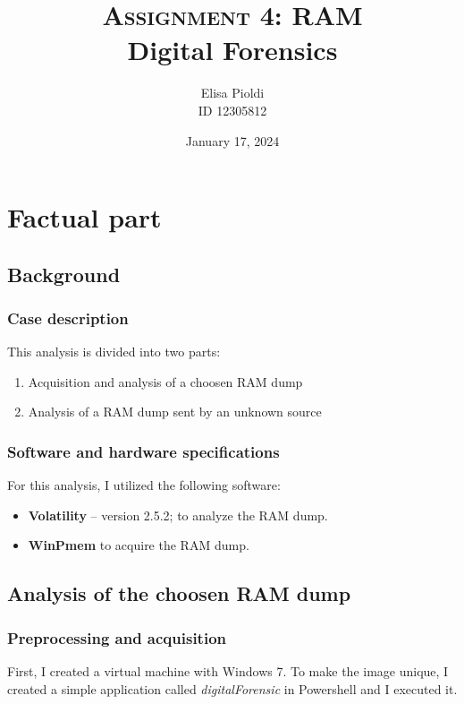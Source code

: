 \documentclass[12pt]{article}
\title{\textbf{\textsc{Assignment 4: RAM}}\\Digital Forensics}
\author{Elisa Pioldi\\
        ID 12305812}
\date{January 17, 2024}
\begin{document}
\maketitle

\section{Factual part}

\subsection{Background}

\subsubsection{Case description}

This analysis is divided into two parts: 
\begin{enumerate}
        \item Acquisition and analysis of a choosen RAM dump
        \item Analysis of a RAM dump sent by an unknown source
\end{enumerate}

\subsubsection{Software and hardware specifications}
\label{sec:specs}

For this analysis, I utilized the following software:

\begin{itemize}
    \item \textbf{Volatility} \cite{volatility} -- version 2.5.2; to analyze the RAM dump.
    \item \textbf{WinPmem} \cite{winpmem} to acquire the RAM dump.
\end{itemize}

\subsection{Analysis of the choosen RAM dump}

\subsubsection{Preprocessing and acquisition}

First, I created a virtual machine with Windows 7. To make the image unique, I created a simple application called \textit{digitalForensic} in Powershell and I executed it. 
\end{document}
